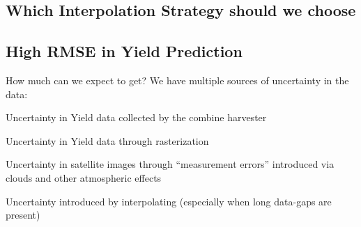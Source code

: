 {    \subsection{Which Interpolation Strategy should we choose}

    \subsection{High RMSE in Yield Prediction}{
        How much can we expect to get? We have multiple sources of uncertainty in the data:
        \begin{Nenumerate}
            \item Uncertainty in Yield data collected by the combine harvester
            \item Uncertainty in Yield data through rasterization
            \item Uncertainty in satellite images through ``measurement errors'' introduced via clouds and other atmospheric effects 
            \item Uncertainty introduced by interpolating (especially when long data-gaps are present)
        \end{Nenumerate}
    }
}

